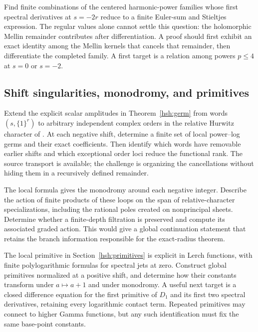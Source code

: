 \begin{question}
Find finite combinations of the centered harmonic-power families
whose first spectral derivatives at $s=-2r$ reduce to a finite
Euler-sum and Stieltjes expression. The regular values alone cannot
settle this question: the holomorphic Mellin remainder contributes
after differentiation. A proof should first exhibit an exact
identity among the Mellin kernels that cancels that remainder, then
differentiate the completed family. A first target is a relation
among powers $p\le4$ at $s=0$ or $s=-2$.
\end{question}

\subsection{Shift singularities, monodromy, and primitives}

\begin{question}
Extend the explicit scalar amplitudes in Theorem~\ref{hsh:germ}
from words $(s,\{1\}^r)$ to arbitrary independent complex orders
in the relative Hurwitz character of \cite{RepoIndependent}.
At each negative shift, determine a finite set of local power--log
germs and their exact coefficients. Then identify which words have
removable earlier shifts and which exceptional order loci reduce the
functional rank. The source transport is available; the challenge
is organizing the cancellations without hiding them in a recursively
defined remainder.
\end{question}

\begin{question}
The local formula gives the monodromy around each negative integer.
Describe the action of finite products of these loops on the span
of relative-character specializations, including the rational poles
created on nonprincipal sheets. Determine whether a finite-depth
filtration is preserved and compute its associated graded action.
This would give a global continuation statement that retains the
branch information responsible for the exact-radius theorem.
\end{question}

\begin{question}
The local primitive in Section~\ref{hsh:primitives} is explicit in
Lerch functions, with finite polylogarithmic formulas for spectral
jets at zero. Construct global primitives normalized at a positive
shift, and determine how their constants transform under
$a\mapsto a+1$ and under monodromy. A useful next target is a
closed difference equation for the first primitive of $D_1$ and its
first two spectral derivatives, retaining every logarithmic contact
term. Repeated primitives may connect to higher Gamma functions,
but any such identification must fix the same base-point constants.
\end{question}

